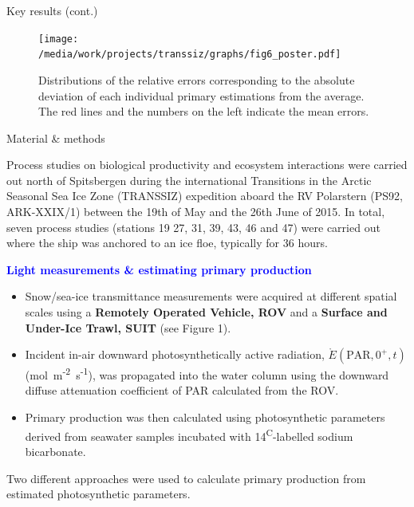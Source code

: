 \documentclass[final]{beamer}
\newlength{\colwidth}
\newcommand{\eparzero}{\ensuremath{\mathring{E}(\text{PAR}, 0^+, t)}}
\newcommand{\micromol}{\textmu mol~m\textsuperscript{-2}~s\textsuperscript{-1}}
\begin{document}
\begin{frame}[t]
\begin{columns}[t]
\begin{column}{\colwidth}
\begin{block}{Key results (cont.)}
				\begin{figure}
					\centering
					\texttt{[image: /media/work/projects/transsiz/graphs/fig6\_poster.pdf]}
					\caption{Distributions of the relative errors corresponding to the absolute deviation of each individual primary estimations from the average. The red lines and the numbers on the left indicate the mean errors.}
				\end{figure}

			\end{block}

			\vspace{-3.0cm}
			\begin{block}{\small Material \& methods}

				\footnotesize

				Process studies on biological productivity and ecosystem interactions were carried out north of Spitsbergen during the international Transitions in the Arctic Seasonal Sea Ice Zone (TRANSSIZ) expedition aboard the RV Polarstern (PS92, ARK-XXIX/1) between the 19th of May and the 26th June of 2015. In total, seven process studies (stations 19 27, 31, 39, 43, 46 and 47) were carried out where the ship was anchored to an ice floe, typically for 36 hours.

				\textcolor{blue}{\textbf{Light measurements \& estimating primary production}}

				\begin{itemize}
					\justifying
					\item Snow/sea-ice transmittance measurements were acquired at different spatial scales using a \textbf{Remotely Operated Vehicle, ROV} and a \textbf{Surface and Under-Ice Trawl, SUIT} (see Figure 1).
					\item Incident in-air downward photosynthetically active radiation, \eparzero{} (\micromol{}), was propagated into the water column using the downward diffuse attenuation coefficient of PAR calculated from the ROV.
					\item Primary production was then calculated using photosynthetic parameters derived from seawater samples incubated with 14\textsuperscript{C}-labelled sodium bicarbonate.
				\end{itemize}

				Two different approaches were used to calculate primary production from estimated photosynthetic parameters.


\end{block}
\end{column}
\end{columns}
\end{frame}
\end{document}
